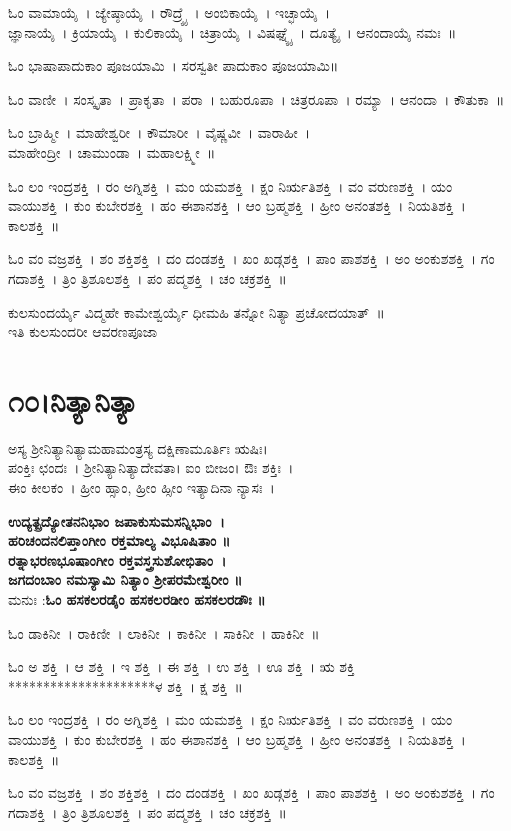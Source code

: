 ಓಂ ವಾಮಾಯೈ~। ಜ್ಯೇಷ್ಠಾಯೈ~। ರೌದ್ರ್ಯೈ~। ಅಂಬಿಕಾಯೈ~। ಇಚ್ಛಾಯೈ~। \\ಜ್ಞಾನಾಯೈ~। ಕ್ರಿಯಾಯೈ~। ಕುಲಿಕಾಯೈ~। ಚಿತ್ರಾಯೈ~। ವಿಷಘ್ನ್ಯೈ~। ದೂತ್ಯೈ~। ಆನಂದಾಯೈ ನಮಃ~॥

ಓಂ ಭಾಷಾಪಾದುಕಾಂ ಪೂಜಯಾಮಿ~। ಸರಸ್ವತೀ ಪಾದುಕಾಂ ಪೂಜಯಾಮಿ॥ 

ಓಂ ವಾಣೀ~। ಸಂಸ್ಕೃತಾ~। ಪ್ರಾಕೃತಾ~। ಪರಾ~। ಬಹುರೂಪಾ~। ಚಿತ್ರರೂಪಾ~। ರಮ್ಯಾ~। ಆನಂದಾ~। ಕೌತುಕಾ~॥ 

ಓಂ ಬ್ರಾಹ್ಮೀ~। ಮಾಹೇಶ್ವರೀ~। ಕೌಮಾರೀ~। ವೈಷ್ಣವೀ~। ವಾರಾಹೀ~। \\ ಮಾಹೇಂದ್ರೀ~। ಚಾಮುಂಡಾ~। ಮಹಾಲಕ್ಷ್ಮೀ~॥ 

ಓಂ ಲಂ ಇಂದ್ರಶಕ್ತಿ~। ರಂ ಅಗ್ನಿಶಕ್ತಿ~। ಮಂ ಯಮಶಕ್ತಿ~। ಕ್ಷಂ ನಿರ್ಋತಿಶಕ್ತಿ~। ವಂ ವರುಣಶಕ್ತಿ~। ಯಂ ವಾಯುಶಕ್ತಿ~। ಕುಂ ಕುಬೇರಶಕ್ತಿ~। ಹಂ ಈಶಾನಶಕ್ತಿ~। ಆಂ ಬ್ರಹ್ಮಶಕ್ತಿ~। ಹ್ರೀಂ ಅನಂತಶಕ್ತಿ~। ನಿಯತಿಶಕ್ತಿ~। ಕಾಲಶಕ್ತಿ~॥ 

ಓಂ ವಂ ವಜ್ರಶಕ್ತಿ~। ಶಂ ಶಕ್ತಿಶಕ್ತಿ~। ದಂ ದಂಡಶಕ್ತಿ~। ಖಂ ಖಡ್ಗಶಕ್ತಿ~। ಪಾಂ ಪಾಶಶಕ್ತಿ~। ಅಂ ಅಂಕುಶಶಕ್ತಿ~। ಗಂ ಗದಾಶಕ್ತಿ~। ತ್ರಿಂ ತ್ರಿಶೂಲಶಕ್ತಿ~। ಪಂ ಪದ್ಮಶಕ್ತಿ~। ಚಂ ಚಕ್ರಶಕ್ತಿ~॥ 

ಕುಲಸುಂದರ್ಯೈ ವಿದ್ಮಹೇ ಕಾಮೇಶ್ವರ್ಯೈ ಧೀಮಹಿ ತನ್ನೋ ನಿತ್ಯಾ ಪ್ರಚೋದಯಾತ್~॥\\
ಇತಿ ಕುಲಸುಂದರೀ ಆವರಣಪೂಜಾ
\section{೧೦।ನಿತ್ಯಾನಿತ್ಯಾ}
ಅಸ್ಯ ಶ್ರೀನಿತ್ಯಾನಿತ್ಯಾಮಹಾಮಂತ್ರಸ್ಯ ದಕ್ಷಿಣಾಮೂರ್ತಿಃ ಋಷಿಃ।\\ ಪಂಕ್ತಿಃ ಛಂದಃ~। ಶ್ರೀನಿತ್ಯಾನಿತ್ಯಾದೇವತಾ। ಐಂ ಬೀಜಂ। ಔಃ ಶಕ್ತಿಃ~।\\ ಈಂ ಕೀಲಕಂ~। ಹ್ರೀಂ ಹ್ಸಾಂ, ಹ್ರೀಂ ಹ್ಸೀಂ ಇತ್ಯಾದಿನಾ ನ್ಯಾಸಃ~।

{\bfseries ಉದ್ಯತ್ಪ್ರದ್ಯೋತನನಿಭಾಂ ಜಪಾಕುಸುಮಸನ್ನಿಭಾಂ~।\\
ಹರಿಚಂದನಲಿಪ್ತಾಂಗೀಂ ರಕ್ತಮಾಲ್ಯ ವಿಭೂಷಿತಾಂ ॥\\
ರತ್ನಾಭರಣಭೂಷಾಂಗೀಂ ರಕ್ತವಸ್ತ್ರಸುಶೋಭಿತಾಂ~।\\
ಜಗದಂಬಾಂ ನಮಸ್ಯಾಮಿ ನಿತ್ಯಾಂ ಶ್ರೀಪರಮೇಶ್ವರೀಂ ॥\\}
ಮನುಃ :{\bfseries ಓಂ ಹಸಕಲರಡೈಂ ಹಸಕಲರಡೀಂ ಹಸಕಲರಡೌಃ ॥}

ಓಂ ಡಾಕಿನೀ~। ರಾಕಿಣೀ~। ಲಾಕಿನೀ~। ಕಾಕಿನೀ~। ಸಾಕಿನೀ~। ಹಾಕಿನೀ~॥ 

ಓಂ ಅ ಶಕ್ತಿ~। ಆ ಶಕ್ತಿ~। ಇ ಶಕ್ತಿ~। ಈ ಶಕ್ತಿ~। ಉ ಶಕ್ತಿ~। ಊ ಶಕ್ತಿ~। ಋ ಶಕ್ತಿ *********************ಳ ಶಕ್ತಿ~। ಕ್ಷ ಶಕ್ತಿ~॥ 

ಓಂ ಲಂ ಇಂದ್ರಶಕ್ತಿ~। ರಂ ಅಗ್ನಿಶಕ್ತಿ~। ಮಂ ಯಮಶಕ್ತಿ~। ಕ್ಷಂ ನಿರ್ಋತಿಶಕ್ತಿ~। ವಂ ವರುಣಶಕ್ತಿ~। ಯಂ ವಾಯುಶಕ್ತಿ~। ಕುಂ ಕುಬೇರಶಕ್ತಿ~। ಹಂ ಈಶಾನಶಕ್ತಿ~। ಆಂ ಬ್ರಹ್ಮಶಕ್ತಿ~। ಹ್ರೀಂ ಅನಂತಶಕ್ತಿ~। ನಿಯತಿಶಕ್ತಿ~। ಕಾಲಶಕ್ತಿ~॥ 

ಓಂ ವಂ ವಜ್ರಶಕ್ತಿ~। ಶಂ ಶಕ್ತಿಶಕ್ತಿ~। ದಂ ದಂಡಶಕ್ತಿ~। ಖಂ ಖಡ್ಗಶಕ್ತಿ~। ಪಾಂ ಪಾಶಶಕ್ತಿ~। ಅಂ ಅಂಕುಶಶಕ್ತಿ~। ಗಂ ಗದಾಶಕ್ತಿ~। ತ್ರಿಂ ತ್ರಿಶೂಲಶಕ್ತಿ~। ಪಂ ಪದ್ಮಶಕ್ತಿ~। ಚಂ ಚಕ್ರಶಕ್ತಿ~॥ 

